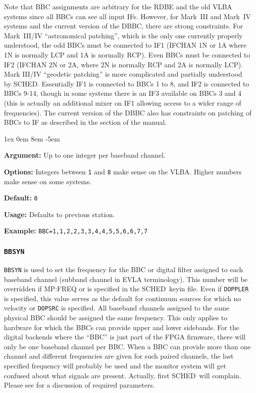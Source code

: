 \documentclass{report}
\newcommand{\sched}{{\sc SCHED}}
\newcommand{\schedb}{{\sc SCHED~}}
\newcommand{\rcwbox}[5]{
  \begin{list}{}{\parsep 1ex  \itemsep 0em
                 \leftmargin 8em  \itemindent -5em }
    \item {\bf Argument:} #1
    \item {\bf Options:}  #2
    \item {\bf Default:}  #3
    \item {\bf Usage:}    #4
    \item {\bf Example:}  #5
  \end{list}
}
\begin{document}
Note that BBC assignments are arbitrary for the RDBE and the old VLBA
systems since all BBCs can see all input IFs.  However, for Mark~III and
Mark~IV systems and the current version of the DBBC, there are strong
constraints.  For Mark~III/IV ``astronomical patching'', which is the
only one currently properly understood, the odd BBCs must be connected
to IF1 (IFCHAN 1N or 1A where 1N is normally LCP and 1A is normally
RCP).  Even BBCs must be connected to IF2 (IFCHAN 2N or 2A, where 2N is
normally RCP and 2A is normally LCP). Mark III/IV ``geodetic patching''
is more complicated and partially understood by \sched. Essentially IF1
is connected to BBCs 1 to 8, and IF2 is connected to BBCs 9-14, though
in some systems there is an IF3 available on BBCs 3 and 4 (this is
actually an additional mixer on IF1 allowing access to a wider range of
frequencies). The current version of the DBBC also has constraints on
patching of BBCs to IF as described in the  section of the manual.

\rcwbox
{Up to one integer per baseband channel.}
{Integers between {\tt 1} and {\tt 8} make sense on the VLBA.  Higher
numbers make sense on some systems.}
{{\tt 0}}
{Defaults to previous station.}
{{\tt BBC=1,1,2,2,3,3,4,4,5,5,6,6,7,7}}


\subsubsection{\label{SP:BBSYN}{\tt BBSYN}}

{\tt BBSYN} is used to set the frequency for the BBC or digital filter
assigned to each baseband channel (subband channel in EVLA
terminology). This number will be overridden if 
{MP:FREQ} or  is specified in the
\schedb keyin file. Even if {\tt DOPPLER} is specified, this value
serves as the default for continuum sources for which no velocity or
{\tt DOPSRC} is specified. All baseband channels assigned to the same
physical BBC should be assigned the same frequency.  This only applies
to hardware for which the BBCs can provide upper and lower sidebands.
For the digital backends where the ``BBC'' is just part of the FPGA
firmware, there will only be one baseband channel per BBC.  When a BBC
can provide more than one channel and different frequencies are given
for such paired channels, the last specified frequency will probably
be used and the monitor system will get confused about what signals
are present. Actually, first \schedb will complain.  Please see
 for a discussion of required
parameters.
\end{document}
